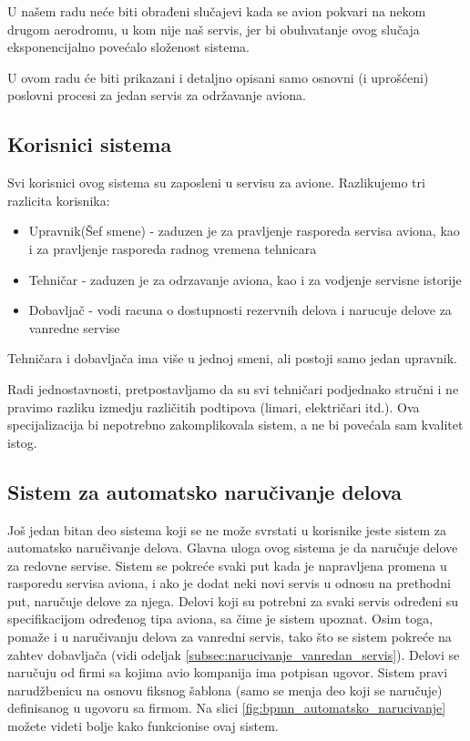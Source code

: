 \documentclass[a4paper]{article}
\begin{document}
U našem radu neće biti obrađeni slučajevi kada se avion pokvari na nekom drugom aerodromu, u kom nije naš servis, jer bi obuhvatanje ovog slučaja  eksponencijalno povećalo složenost sistema.

U ovom radu će biti prikazani i detaljno opisani samo osnovni (i uprošćeni) poslovni procesi za jedan servis za održavanje aviona.
    


\subsection{Korisnici sistema}
\label{subsec:korisnici_sistema}
Svi korisnici ovog sistema su zaposleni u servisu za avione. Razlikujemo tri razlicita korisnika:
\begin{itemize}
    \item Upravnik(Šef smene) - zaduzen je za pravljenje rasporeda servisa aviona, kao i za pravljenje rasporeda radnog vremena tehnicara
    \item Tehničar - zaduzen je za odrzavanje aviona, kao i za vodjenje servisne istorije
    \item Dobavljač - vodi racuna o dostupnosti rezervnih delova i narucuje delove za vanredne servise
\end{itemize}
Tehničara i dobavljača ima više u jednoj smeni, ali postoji samo jedan upravnik.

Radi jednostavnosti, pretpostavljamo da su svi tehničari podjednako stručni i ne pravimo razliku izmedju različitih podtipova (limari, električari itd.). Ova specijalizacija bi nepotrebno zakomplikovala sistem, a ne bi povećala sam kvalitet istog.

\subsection{Sistem za automatsko naručivanje delova}
\label{subsec:sistem_za_automatsko_narucivanje_delova}
Još jedan bitan deo sistema koji se ne može svrstati u korisnike jeste sistem za automatsko naručivanje delova. Glavna uloga ovog sistema je da naručuje delove za redovne servise. Sistem se pokreće svaki put kada je napravljena promena u rasporedu servisa aviona, i ako je dodat neki novi servis u odnosu na prethodni put, naručuje delove za njega. Delovi koji su potrebni za svaki servis određeni su specifikacijom određenog tipa aviona, sa čime je sistem upoznat. Osim toga, pomaže i u naručivanju delova za vanredni servis, tako što se sistem pokreće na zahtev dobavljača (vidi odeljak \ref{subsec:narucivanje_vanredan_servis}). Delovi se naručuju od firmi sa kojima avio kompanija ima potpisan ugovor. Sistem pravi narudžbenicu na osnovu fiksnog šablona (samo se menja deo koji se naručuje) definisanog u ugovoru sa firmom. Na slici \ref{fig:bpmn_automatsko_narucivanje} možete videti bolje kako funkcionise ovaj sistem.
\end{document}
